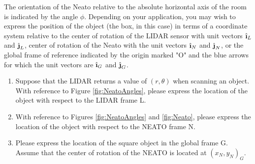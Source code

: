 \documentclass[M3_Night6_Solutions]{subfiles}
\begin{document}
\begin{enumerate}[series=exercises, label=\textbf{Exercise} (\arabic*)]
\begin{enumerate}[resume=exercises, label=\textbf{Exercise} (\arabic*)]
The orientation of the Neato relative to the absolute horizontal axis of the room is indicated by the angle $\phi$. Depending on your application, you may wish to express the position of the object (the box, in this case) in terms of a coordinate system relative to the center of rotation of the LIDAR sensor with unit vectors $\ihat_L$ and $\jhat_L$, center of rotation of the Neato with the unit vectors $\ihat_N$ and $\jhat_N$, or the global frame of reference indicated by the origin marked "O" and the blue arrows for which the unit vectors are $\ihat_G$ and $\jhat_G$.

\begin{enumerate}[resume=exercises, label=\textbf{Exercise} (\arabic*)]
\item Suppose that the LIDAR returns a value of $(r, \theta)$ when scanning an object. With reference to Figure \ref{fig:NeatoAngles}, please express the location of the object with respect to the LIDAR frame L.
\item With reference to Figures \ref{fig:NeatoAngles} and \ref{fig:Neato}, please express the location of the object with respect to the NEATO frame N.
\item Please express the location of the square object in the global frame G. Assume that the center of rotation of the NEATO is located at $(x_N, y_N)_G$.
    

\end{enumerate}
\end{enumerate}
\end{enumerate}
\end{document}
